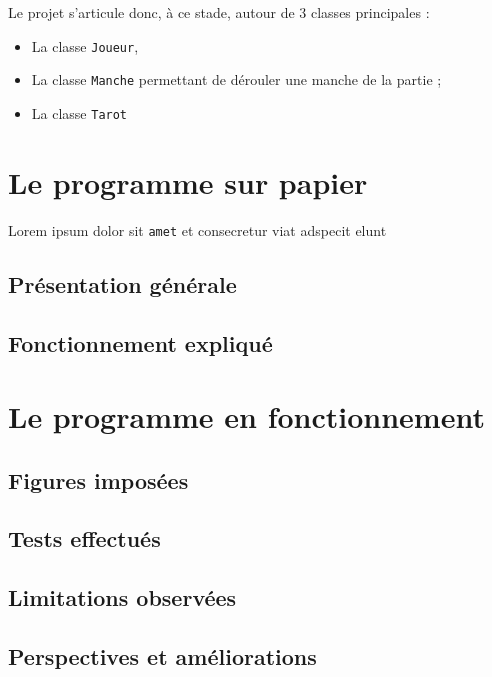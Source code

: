       Le projet s'articule donc, à ce stade, autour de 3 classes principales :
      \begin{itemize}
         \item La classe \texttt{Joueur},
         \item La classe \texttt{Manche} permettant de dérouler une manche de la partie ;
         \item La classe \texttt{Tarot}
      \end{itemize}


\section{Le programme sur papier}
   Lorem ipsum dolor sit \texttt{amet} et consecretur viat adspecit elunt

   \subsection{Présentation générale}

   \subsection{Fonctionnement expliqué}
   

\section{Le programme en fonctionnement}

   \subsection{Figures imposées}

   \subsection{Tests effectués}
   
   \subsection{Limitations observées}
   
   \subsection{Perspectives et améliorations}
